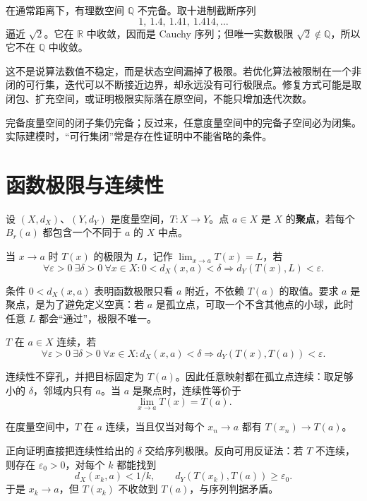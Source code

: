 
在通常距离下，有理数空间 $\mathbb Q$ 不完备。取十进制截断序列
\[
  1,\ 1.4,\ 1.41,\ 1.414,\ldots
\]
逼近 $\sqrt2$。它在 $\mathbb R$ 中收敛，因而是 Cauchy 序列；但唯一实数极限 $\sqrt2\notin\mathbb Q$，所以它不在 $\mathbb Q$ 中收敛。

这不是说算法数值不稳定，而是状态空间漏掉了极限。若优化算法被限制在一个非闭的可行集，迭代可以不断接近边界，却永远没有可行极限点。修复方式可能是取闭包、扩充空间，或证明极限实际落在原空间，不能只增加迭代次数。

\begin{note}
完备度量空间的闭子集仍完备；反过来，任意度量空间中的完备子空间必为闭集。实际建模时，“可行集闭”常是存在性证明中不能省略的条件。
\end{note}

\section{函数极限与连续性}

设 $(X,d_X)$、$(Y,d_Y)$ 是度量空间，$T:X\to Y$。点 $a\in X$ 是 $X$ 的\textbf{聚点}，若每个 $B_r(a)$ 都包含一个不同于 $a$ 的 $X$ 中点。

\begin{definition}[函数极限]
当 $x\to a$ 时 $T(x)$ 的极限为 $L$，记作 $\lim_{x\to a}T(x)=L$，若
\[
 \forall\varepsilon>0\ \exists\delta>0\ \forall x\in X:
 0<d_X(x,a)<\delta\Longrightarrow d_Y(T(x),L)<\varepsilon.
\]
\end{definition}

条件 $0<d_X(x,a)$ 表明函数极限只看 $a$ 附近，不依赖 $T(a)$ 的取值。要求 $a$ 是聚点，是为了避免定义空真：若 $a$ 是孤立点，可取一个不含其他点的小球，此时任意 $L$ 都会“通过”，极限不唯一。

\begin{definition}[连续性]
$T$ 在 $a\in X$ 连续，若
\[
 \forall\varepsilon>0\ \exists\delta>0\ \forall x\in X:
 d_X(x,a)<\delta\Longrightarrow d_Y(T(x),T(a))<\varepsilon.
\]
\end{definition}

连续性不穿孔，并把目标固定为 $T(a)$。因此任意映射都在孤立点连续：取足够小的 $\delta$，邻域内只有 $a$。当 $a$ 是聚点时，连续性等价于
\[
  \lim_{x\to a}T(x)=T(a).
\]


在度量空间中，$T$ 在 $a$ 连续，当且仅当对每个 $x_n\to a$ 都有 $T(x_n)\to T(a)$。

正向证明直接把连续性给出的 $\delta$ 交给序列极限。反向可用反证法：若 $T$ 不连续，则存在 $\varepsilon_0>0$，对每个 $k$ 都能找到
\[
 d_X(x_k,a)<1/k,\qquad d_Y(T(x_k),T(a))\geq\varepsilon_0.
\]
于是 $x_k\to a$，但 $T(x_k)$ 不收敛到 $T(a)$，与序列判据矛盾。

